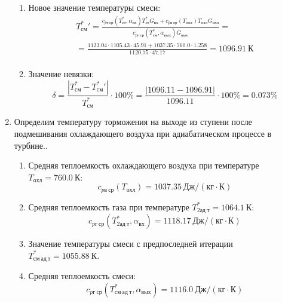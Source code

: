 \documentclass[a4paper,12pt]{article}
\begin{document}
\begin{enumerate}
\begin{enumerate}
            \item Новое значение температуры смеси:
            \begin{gather*}
                T_{см}^*\prime = \frac{
                        c_{pг\ ср} (T_{ст}^*, \alpha_{вх}) T_{ст}^* G_{вх} + c_{pв\ ср} (T_{охл}) T_{охл} G_{охл}
                    }{
                        c_{pг\ ср} (T_{см}^{*}, \alpha_{вых}) G_{вых}
                    } =\\
                = \frac{
                    1123.04
                    \cdot 1105.43 \cdot 45.91 +
                    1037.35
                    \cdot 760.0 \cdot 1.258
                }{
                    1120.75
                    \cdot  47.17
                } =
                1096.91\ К\\
            \end{gather*}

            \item Значение невязки:
            \[
                \delta = \frac{ \left| T_{см}^{*} - T_{см}^*\prime \right| }{T_{см}^{*}} \cdot 100 \% =
                    \frac{
                        \left| 1096.11 - 1096.91 \right|
                    }{
                        1096.11
                    } \cdot 100 \% =
                0.073 \%
            \]
        \end{enumerate}


        \item Определим температуру торможения на выходе из ступени после подмешивания охлаждающего воздуха при адиабатическом процессе в турбине..
        \begin{enumerate}

            \item Средняя теплоемкость охлаждающего воздуха при температуре $T_{охл} = 760.0\ К $:
            \[
                c_{pв\ ср} (T_{охл}) = 1037.35\ Дж/ (кг \cdot К)
            \]

            \item Средняя теплоемкость газа при температуре $T_{2ад\ т}^* = 1064.1 \ К $:
            \[
                c_{pг\ ср} (T_{2ад\ т}^*, \alpha_{вх}) =
                1118.17\ Дж/ (кг \cdot К)
            \]

            \item Значение температуры смеси с предпоследней итерации $T_{см\ ад\ т}^{*} = 1055.88\ К$.

            \item Средняя теплоемкость смеси:
            \[
                c_{pг\ ср} (T_{см\ ад\ т}^{*}, \alpha_{вых}) =
                1116.0\ Дж/ (кг \cdot К)
            \]


\end{enumerate}
\end{enumerate}
\end{document}

